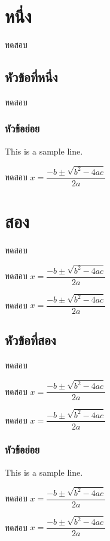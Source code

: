 \documentclass{book}
\begin{document}
\chapter{หนึ่ง}

ทดสอบ

\section{หัวข้อที่หนึ่ง}

ทดสอบ

\subsection{หัวข้อย่อย}

This is a sample line.

\begin{theorem}
ทดสอบ $x = \dfrac{-b\pm\sqrt{b^2-4ac}}{2a}$
\end{theorem}


\chapter{สอง}

ทดสอบ

\begin{theorem}
ทดสอบ $x = \dfrac{-b\pm\sqrt{b^2-4ac}}{2a}$
\end{theorem}

\begin{theorem}
ทดสอบ $x = \dfrac{-b\pm\sqrt{b^2-4ac}}{2a}$
\end{theorem}

\section{หัวข้อที่สอง}

ทดสอบ

\begin{theorem}
ทดสอบ $x = \dfrac{-b\pm\sqrt{b^2-4ac}}{2a}$
\end{theorem}

\begin{theorem}
ทดสอบ $x = \dfrac{-b\pm\sqrt{b^2-4ac}}{2a}$
\end{theorem}

\subsection{หัวข้อย่อย}

This is a sample line.

\begin{theorem}
ทดสอบ $x = \dfrac{-b\pm\sqrt{b^2-4ac}}{2a}$
\end{theorem}

\begin{theorem}
ทดสอบ $x = \dfrac{-b\pm\sqrt{b^2-4ac}}{2a}$
\end{theorem}
\end{document}
